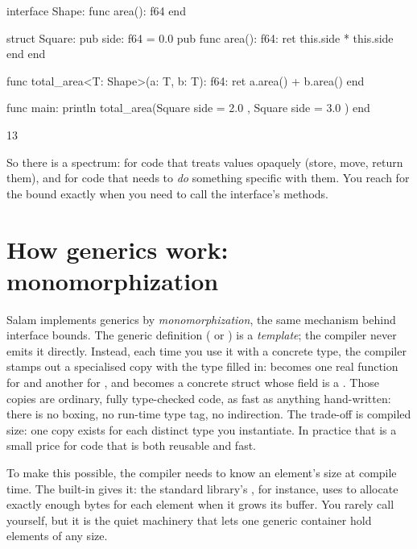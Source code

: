 \begin{salamen}
interface Shape:
    func area(): f64
end

struct Square:
    pub side: f64 = 0.0
    pub func area(): f64: ret this.side * this.side end
end

func total_area<T: Shape>(a: T, b: T): f64:
    ret a.area() + b.area()
end

func main:
    println total_area(Square { side = 2.0 }, Square { side = 3.0 })
end
\end{salamen}

\begin{progout}
13
\end{progout}

So there is a spectrum:  for code that treats values opaquely (store,
move, return them), and  for code that needs to
\emph{do} something specific with them. You reach for the bound exactly when you
need to call the interface's methods.

\section{How generics work: monomorphization}

\begin{deep}
Salam implements generics by \emph{monomorphization}, the same mechanism behind
interface bounds. The generic definition ( or )
is a \emph{template}; the compiler never emits it directly. Instead, each time you
use it with a concrete type, the compiler stamps out a specialised copy with the
type filled in:  becomes one real function for  and another
for , and  becomes a concrete struct whose
 field is a . Those
copies are ordinary, fully type-checked code, as fast
as anything hand-written: there is no boxing, no run-time type tag, no
indirection. The trade-off is compiled size: one copy exists for each distinct
type you instantiate. In practice that is a small price for code that is both
reusable and fast.

To make this possible, the compiler needs to know an element's size at compile
time. The built-in  gives it: the standard library's
, for instance, uses  to allocate exactly enough
bytes for each element when it grows its buffer. You rarely call 
yourself, but it is the quiet machinery that lets one generic container hold
elements of any size.
\end{deep}

